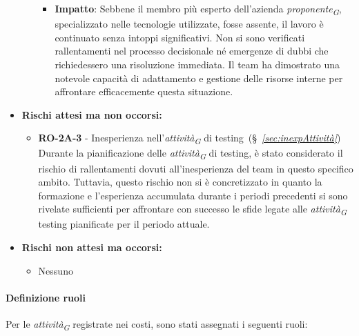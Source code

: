 \begin{itemize}
\begin{itemize}
\begin{itemize}
                    \item \textbf{Impatto}: 
                    Sebbene il membro più esperto dell'azienda \textit{proponente}\textsubscript{\textit{G}}, specializzato nelle tecnologie utilizzate, fosse assente, il lavoro è continuato senza intoppi significativi. Non si sono verificati rallentamenti nel processo decisionale né emergenze di dubbi che richiedessero una risoluzione immediata. Il team ha dimostrato una notevole capacità di adattamento e gestione delle risorse interne per affrontare efficacemente questa situazione.
                \end{itemize}
        \end{itemize}
    \item \textbf{Rischi attesi ma non occorsi:} 
        \begin{itemize}
            \item \textbf{RO-2A-3} - Inesperienza nell'\textit{attività}\textsubscript{\textit{G}} di testing~(\S~\textit{\ref{sec:inexpAttività}}) \\
            Durante la pianificazione delle \textit{attività}\textsubscript{\textit{G}} di testing, è stato considerato il rischio di rallentamenti dovuti all'inesperienza del team in questo specifico ambito. Tuttavia, questo rischio non si è concretizzato in quanto la formazione e l'esperienza accumulata durante i periodi precedenti si sono rivelate sufficienti per affrontare con successo le sfide legate alle \textit{attività}\textsubscript{\textit{G}} testing pianificate per il periodo attuale.
        \end{itemize}
    \item \textbf{Rischi non attesi ma occorsi:}
        \begin{itemize}
            \item Nessuno
        \end{itemize}
\end{itemize}


\paragraph{Definizione ruoli}
Per le \textit{attività}\textsubscript{\textit{G}} registrate nei costi, sono stati assegnati i seguenti ruoli: 

